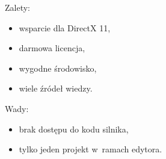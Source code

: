 {\raggedright Zalety:
\begin{itemize}
\item wsparcie dla DirectX 11,
\item darmowa licencja,
\item wygodne środowisko,
\item wiele źródeł wiedzy.
\end{itemize}

Wady:
\begin{itemize}
\item brak dostępu do kodu silnika,
\item tylko jeden projekt w~ramach edytora.
\end{itemize}
}